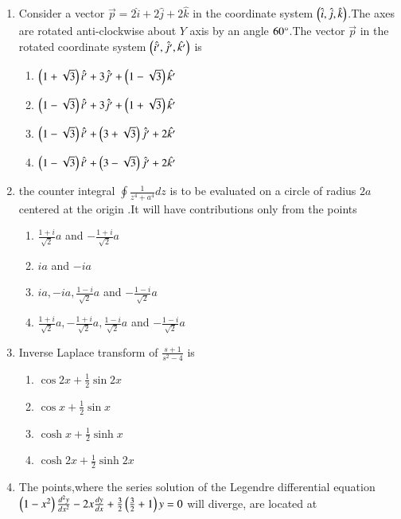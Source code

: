 \documentclass[journal]{IEEEtran}
\begin{document}
\begin{enumerate}[start=18]
    \item Consider a vector $\Vec{p}=
    2\hat{i}+2\hat{j}+2\hat{k}$ in the coordinate system $\left(\hat{i},\hat{j},\hat{k}\right)$.The axes are rotated anti-clockwise about $Y$ axis by an angle $60\degree$.The vector $\Vec{p}$ in the rotated coordinate system $\left(\hat{i^\prime},\hat{j^\prime},\hat{k^\prime}\right)$ is
    \begin{enumerate}
        \item $\left(1+\sqrt{3}\right)\hat{i^\prime}+3\hat{j^\prime}+\left(1-\sqrt{3}\right)\hat{k^\prime}$
        \item $\left(1-\sqrt{3}\right)\hat{i^\prime}+3\hat{j^\prime}+\left(1+\sqrt{3}\right)\hat{k^\prime}$
        \item $\left(1-\sqrt{3}\right)\hat{i^\prime}+\left(3+\sqrt{3}\right)\hat{j^\prime}+2\hat{k^\prime}$
        \item $\left(1-\sqrt{3}\right)\hat{i^\prime}+\left(3-\sqrt{3}\right)\hat{j^\prime}+2\hat{k^\prime}$
    \end{enumerate}
    \item the counter integral $\oint \frac{1}{z^4+a^4}dz$ is to be evaluated on a circle of radius $2a$ centered at the origin .It will have contributions only from the points
    \begin{enumerate}
        \item $\frac{1+i}{\sqrt{2}}a$ and $-\frac{1+i}{\sqrt{2}}a$
        \item $ia$ and $-ia$
        \item $ia,-ia,\frac{1-i}{\sqrt{2}}a$ and $-\frac{1-i}{\sqrt{2}}a$
        \item $\frac{1+i}{\sqrt{2}}a,-\frac{1+i}{\sqrt{2}}a,\frac{1-i}{\sqrt{2}}a$ and $-\frac{1-i}{\sqrt{2}}a$
    \end{enumerate}
    \item Inverse Laplace transform of $\frac{s+1}{s^2-4}$ is
    \begin{enumerate}
        \item $\cos{2x}+\frac{1}{2}\sin{2x}$
        \item $\cos{x}+\frac{1}{2}\sin{x}$
        \item $\cosh{x}+\frac{1}{2}\sinh{x}$
        \item $\cosh{2x}+\frac{1}{2}\sinh{2x}$
    \end{enumerate}
    \item The points,where the series solution of the Legendre differential equation $\left(1-x^2\right)\frac{d^2 y}{dx^2}-2x\frac{dy}{dx}+\frac{3}{2}\left(\frac{3}{2}+1\right)y=0$ will diverge, are located at

\end{enumerate}
\end{document}
